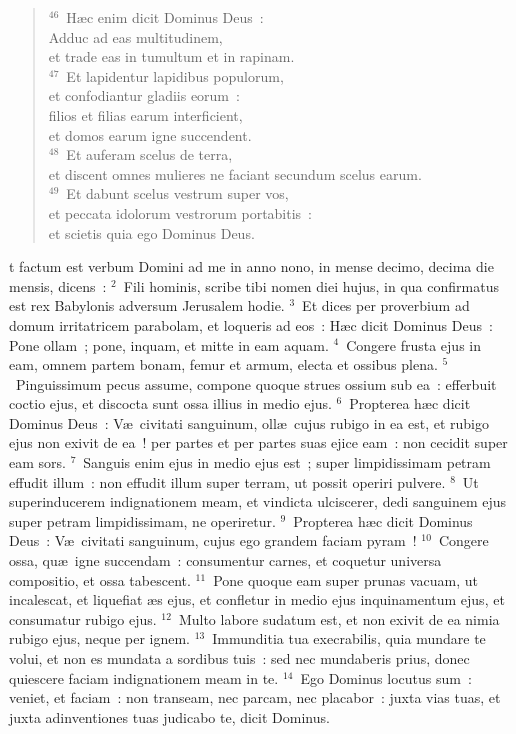 \begin{verse}
${}^{46}$~H\ae c enim dicit Dominus Deus~:\\ Adduc ad eas multitudinem,\\ et trade eas in tumultum et in rapinam.\\
${}^{47}$~Et lapidentur lapidibus populorum,\\ et confodiantur gladiis eorum~:\\ filios et filias earum interficient,\\ et domos earum igne succendent.\\
${}^{48}$~Et auferam scelus de terra,\\ et discent omnes mulieres ne faciant secundum scelus earum.\\
${}^{49}$~Et dabunt scelus vestrum super vos,\\ et peccata idolorum vestrorum portabitis~:\\ et scietis quia ego Dominus Deus.\end{verse}



\bchapter
{}t factum est verbum Domini ad me in anno nono, in mense decimo, decima die mensis, dicens~:
${}^{2}$~Fili hominis, scribe tibi nomen diei hujus, in qua confirmatus est rex Babylonis adversum Jerusalem hodie.
${}^{3}$~Et dices per proverbium ad domum irritatricem parabolam, et loqueris ad eos~: H\ae c dicit Dominus Deus~: Pone ollam~; pone, inquam, et mitte in eam aquam.
${}^{4}$~Congere frusta ejus in eam, omnem partem bonam, femur et armum, electa et ossibus plena.
${}^{5}$~Pinguissimum pecus assume, compone quoque strues ossium sub ea~: efferbuit coctio ejus, et discocta sunt ossa illius in medio ejus.
${}^{6}$~Propterea h\ae c dicit Dominus Deus~: V\ae\ civitati sanguinum, oll\ae\ cujus rubigo in ea est, et rubigo ejus non exivit de ea~! per partes et per partes suas ejice eam~: non cecidit super eam sors.
${}^{7}$~Sanguis enim ejus in medio ejus est~; super limpidissimam petram effudit illum~: non effudit illum super terram, ut possit operiri pulvere.
${}^{8}$~Ut superinducerem indignationem meam, et vindicta ulciscerer, dedi sanguinem ejus super petram limpidissimam, ne operiretur.
${}^{9}$~Propterea h\ae c dicit Dominus Deus~: V\ae\ civitati sanguinum, cujus ego grandem faciam pyram~!
${}^{10}$~Congere ossa, qu\ae\ igne succendam~: consumentur carnes, et coquetur universa compositio, et ossa tabescent.
${}^{11}$~Pone quoque eam super prunas vacuam, ut incalescat, et liquefiat \ae s ejus, et confletur in medio ejus inquinamentum ejus, et consumatur rubigo ejus.
${}^{12}$~Multo labore sudatum est, et non exivit de ea nimia rubigo ejus, neque per ignem.
${}^{13}$~Immunditia tua execrabilis, quia mundare te volui, et non es mundata a sordibus tuis~: sed nec mundaberis prius, donec quiescere faciam indignationem meam in te.
${}^{14}$~Ego Dominus locutus sum~: veniet, et faciam~: non transeam, nec parcam, nec placabor~: juxta vias tuas, et juxta adinventiones tuas judicabo te, dicit Dominus.



